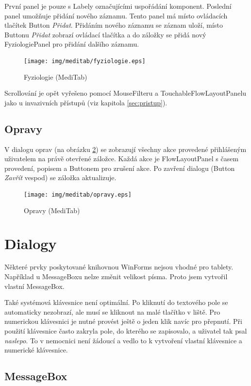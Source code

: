 První panel je pouze s Labely označujícími uspořádání komponent. Poslední panel umožňuje přidání nového záznamu. Tento panel má místo ovládacích tlačítek Button \emph{Přidat}. Přidáním nového záznamu se záznam uloží, místo Buttonu \emph{Přidat} zobrazí ovládací tlačítka a do záložky se přidá nový FyziologiePanel pro přidání dalšího záznamu.

\begin{figure}[H]
	\centering
	\texttt{[image: img/meditab/fyziologie.eps]}
	\caption{Fyziologie (MediTab)}
  \label{fig:fyziologie}
\end{figure}

Scrollování je opět vyřešeno pomocí MouseFilteru a TouchableFlowLayoutPanelu jako u invazivních přístupů (viz kapitola \ref{sec:pristup}).


\subsection{Opravy}

V dialogu oprav (na obrázku \ref{fig:opravy}) se zobrazují všechny akce provedené přihlášeným uživatelem na právě otevřené záložce. Každá akce je FlowLayoutPanel s časem provedení, popisem a Buttonem pro zrušení akce. Po zavření dialogu (Button \emph{Zavřít} vespod) se záložka aktualizuje.

\begin{figure}[H]
	\centering
	\texttt{[image: img/meditab/opravy.eps]}
	\caption{Opravy (MediTab)}
  \label{fig:opravy}
\end{figure}



\section{Dialogy}
\label{sec:dialogy}

Některé prvky poskytované knihovnou WinForms nejsou vhodné pro tablety. Například u MessageBoxu nelze změnit velikost písma. Proto jsem vytvořil vlastní MessageBox.

Také systémová klávesnice není optimální. Po kliknutí do textového pole se automaticky nezobrazí, ale musí se kliknout na malé tlačítko v liště. Pro numerickou klávesnici je nutné provést ještě o jeden klik navíc pro přepnutí. Při použití klávesnice často zakryla pole, do kterého se zapisovalo, a uživatel tak psal \emph{naslepo}. To v nemocnici není žádoucí a vedlo to k vytvoření vlastní klávesnice a numerické klávesnice.

\subsection{MessageBox}

